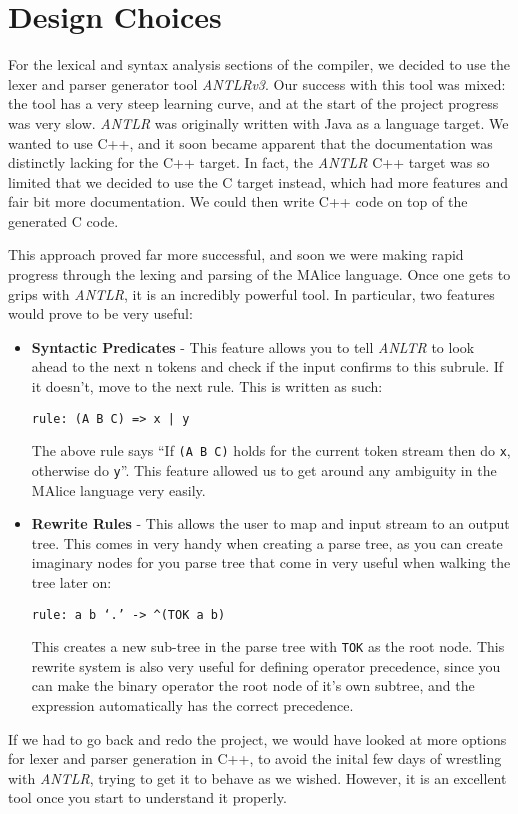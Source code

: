 \documentclass[11pt, notitlepage]{report}
\begin{document}
\section*{Design Choices}
For the lexical and syntax analysis sections of the compiler, we decided to use the lexer and parser generator tool \emph{ANTLRv3}. Our success with this tool was mixed: the tool has a very steep learning curve, and at the start of the project progress was very slow. \emph{ANTLR} was originally written with Java as a language target. We wanted to use C++, and it soon became apparent that the documentation was distinctly lacking for the C++ target. In fact, the \emph{ANTLR} C++ target was so limited that we decided to use the C target instead, which had more features and fair bit more documentation. We could then write C++ code on top of the generated C code.

This approach proved far more successful, and soon we were making rapid progress through the lexing and parsing of the MAlice language. Once one gets to grips with \emph{ANTLR}, it is an incredibly powerful tool. In particular, two features would prove to be very useful:
\begin{itemize}
\item \textbf{Syntactic Predicates} - This feature allows you to tell \emph{ANLTR} to look ahead to the next n tokens and check if the input confirms to this subrule. If it doesn't, move to the next rule. This is written as such:
\begin{center}
	\texttt{rule: (A B C) => x | y}
\end{center}
The above rule says ``If \texttt{(A B C)} holds for the current token stream then do \texttt{x}, otherwise do \texttt{y}''. This feature allowed us to get around any ambiguity in the MAlice language very easily.

\item \textbf{Rewrite Rules} - This allows the user to map and input stream to an output tree. This comes in very handy when creating a parse tree, as you can create imaginary nodes for you parse tree that come in very useful when walking the tree later on:
\begin{center}
	\texttt{rule: a b `.' -> \textasciicircum(TOK a b)}
\end{center}
This creates a new sub-tree in the parse tree with \texttt{TOK} as the root node. This rewrite system is also very useful for defining operator precedence, since you can make the binary operator the root node of it's own subtree, and the expression automatically has the correct precedence.
\end{itemize}
If we had to go back and redo the project, we would have looked at more options for lexer and parser generation in C++, to avoid the inital few days of wrestling with \emph{ANTLR}, trying to get it to behave as we wished. However, it is an excellent tool once you start to understand it properly.
\end{document}
